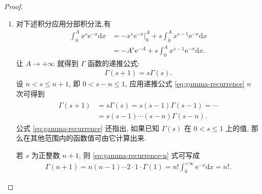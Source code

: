 \documentclass[../../main.tex]{subfiles}%
\begin{document}
\begin{proof}
\begin{enumerate}[(1)]
\item 对下述积分应用分部积分法,有
\begin{align*}
\int_{0}^{A} x^s \mathrm{e}^{-x} \mathrm{d}x &= -x^s \mathrm{e}^{-x} \bigg|_{0}^{A} + s\int_{0}^{A} x^{s-1} \mathrm{e}^{-x} \mathrm{d}x \\
&= -A^s \mathrm{e}^{-A} + s\int_{0}^{A} x^{s-1} \mathrm{e}^{-x} \mathrm{d}x.
\end{align*}
让 $A\to+\infty$ 就得到 $\Gamma$ 函数的递推公式:
\begin{align}
\Gamma(s+1) = s\Gamma(s). \label{eq:gamma-recurrence}
\end{align}
设 $n < s \leqslant n+1$, 即 $0 < s-n \leqslant 1$, 应用递推公式 \eqref{eq:gamma-recurrence} $n$ 次可得到
\begin{align}
\begin{split}
\Gamma(s+1) &= s\Gamma(s) = s(s-1)\Gamma(s-1) = \cdots \\
&= s(s-1)\cdots(s-n)\Gamma(s-n). \label{eq:gamma-recurrence-n}
\end{split}
\end{align}
公式 \eqref{eq:gamma-recurrence} 还指出, 如果已知 $\Gamma(s)$ 在 $0<s\leqslant 1$ 上的值, 那么在其他范围内的函数值可由它计算出来.

若 $s$ 为正整数 $n+1$, 则 \eqref{eq:gamma-recurrence-n} 式可写成
\begin{align*}
\Gamma(n+1) = n(n-1)\cdots2\cdot1\cdot\Gamma(1) = n! \int_{0}^{+\infty} \mathrm{e}^{-x} \mathrm{d}x = n!. 
\end{align*}
\end{enumerate}
\end{proof}
\end{document}

